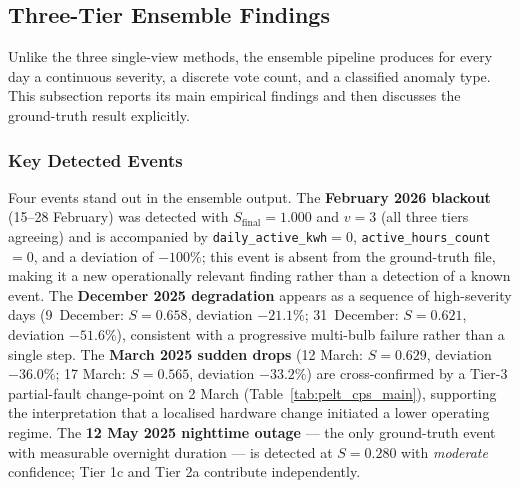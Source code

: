 \documentclass{article}
\begin{document}
\subsection{Three-Tier Ensemble Findings}

Unlike the three single-view methods, the ensemble pipeline produces for every day a continuous severity, a discrete vote count, and a classified anomaly type. This subsection reports its main empirical findings and then discusses the ground-truth result explicitly.

\subsubsection{Key Detected Events}

Four events stand out in the ensemble output. The \textbf{February 2026 blackout} (15--28 February) was detected with $S_{\text{final}}=1.000$ and $v=3$ (all three tiers agreeing) and is accompanied by \texttt{daily\_active\_kwh}$=0$, \texttt{active\_hours\_count}$=0$, and a deviation of $-100\%$; this event is absent from the ground-truth file, making it a new operationally relevant finding rather than a detection of a known event. The \textbf{December 2025 degradation} appears as a sequence of high-severity days (9~December: $S=0.658$, deviation $-21.1\%$; 31~December: $S=0.621$, deviation $-51.6\%$), consistent with a progressive multi-bulb failure rather than a single step. The \textbf{March 2025 sudden drops} (12 March: $S=0.629$, deviation $-36.0\%$; 17 March: $S=0.565$, deviation $-33.2\%$) are cross-confirmed by a Tier-3 partial-fault change-point on 2 March (Table~\ref{tab:pelt_cps_main}), supporting the interpretation that a localised hardware change initiated a lower operating regime. The \textbf{12 May 2025 nighttime outage} --- the only ground-truth event with measurable overnight duration --- is detected at $S=0.280$ with \textit{moderate} confidence; Tier 1c and Tier 2a contribute independently.
\end{document}

